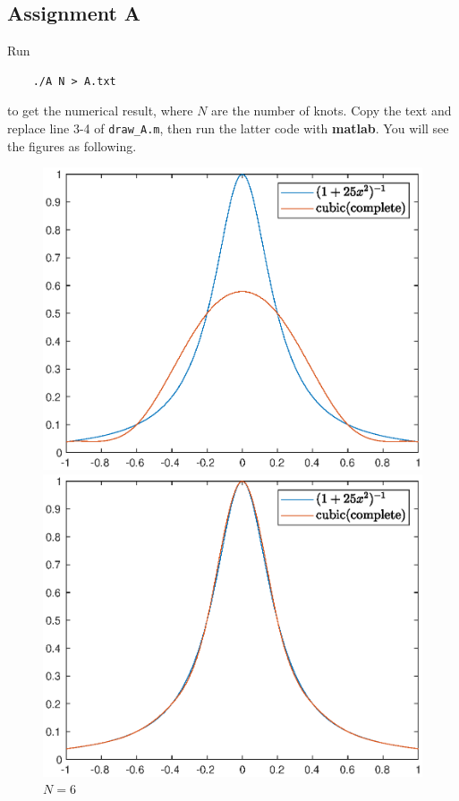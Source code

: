 \documentclass[11pt,en]{elegantpaper}
\begin{document}
\subsection{Assignment A}

Run

\begin{lstlisting}
    ./A N > A.txt
\end{lstlisting}

to get the numerical result, where $N$ are the number of knots. Copy the text and replace line 3-4 of \verb|draw_A.m|, then run the latter code with \textbf{matlab}. You will see the figures as following.

\begin{figure}[htbp]
    \centering
    \begin{minipage}[t]{0.33\linewidth}
        \centering
        \includegraphics[width=0.95\linewidth]{figure/assA_N=6.eps}
        \caption{$N=6$}
        \label{fig:side:a}
    \end{minipage}%
    \begin{minipage}[t]{0.33\linewidth}
        \centering
        \includegraphics[width=0.95\linewidth]{figure/assA_N=11.eps}

\end{minipage}
\end{figure}
\end{document}
